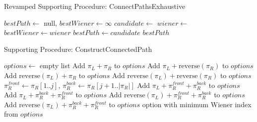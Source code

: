 \documentclass[11pt]{beamer}
\begin{document}
\begin{frame}{Revamped Supporting Procedure: ConnectPathsExhaustive}
	\begin{algorithm}[H]
		\caption{ConnectPathsExhaustive($\pi_L$, $\pi_R$)}
		\begin{algorithmic}[1]
			\State $bestPath \gets$ null, $bestWiener \gets \infty$
			 
			 
			\State $candidate \gets$ 
			\State $wiener \gets$ 
			\State $bestWiener \gets wiener$
			\State $bestPath \gets candidate$
			\EndIf
			\EndFor
			\EndFor
			\State \Return $bestPath$
			\EndProcedure
		\end{algorithmic}
	\end{algorithm}
\end{frame}

\begin{frame}{Supporting Procedure: ConstructConnectedPath}
	\begin{algorithm}[H]
		\caption{ConstructConnectedPath($\pi_L$, $\pi_R$, $i$, $j$)}
		\begin{algorithmic}[1]
			\State $options \gets$ empty list
			 
			\State Add $\pi_L + \pi_R$ to $options$
			\State Add $\pi_L + \text{reverse}(\pi_R)$ to $options$
			\State Add $\text{reverse}(\pi_L) + \pi_R$ to $options$
			\State Add $\text{reverse}(\pi_L) + \text{reverse}(\pi_R)$ to $options$
			 
			\State $\pi_R^{front} \gets \pi_R[1..j]$, $\pi_R^{back} \gets \pi_R[j+1..|\pi_R|]$
			\State Add $\pi_L + \pi_R^{front} + \pi_R^{back}$ to $options$
			\State Add $\pi_L + \pi_R^{back} + \pi_R^{front}$ to $options$
			\State Add $\text{reverse}(\pi_L) + \pi_R^{front} + \pi_R^{back}$ to $options$
			\State Add $\text{reverse}(\pi_L) + \pi_R^{back} + \pi_R^{front}$ to $options$
			\EndIf
			\State \Return option with minimum Wiener index from $options$
			\EndProcedure
		\end{algorithmic}
	\end{algorithm}
\end{frame}
\end{document}
